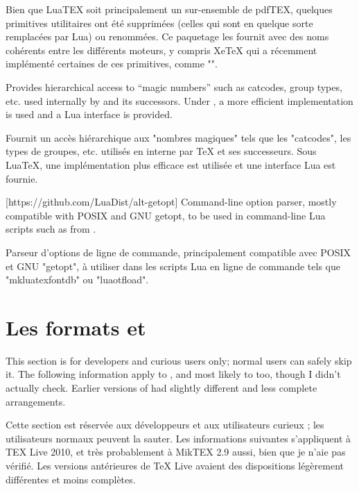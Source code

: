 \documentclass{lltxdoc}
\begin{document}
Bien que LuaTEX soit principalement un sur-ensemble de pdfTEX, quelques primitives utilitaires ont été supprimées (celles qui sont en quelque sorte remplacées par Lua) ou renommées. Ce paquetage les fournit avec des noms cohérents entre les différents moteurs, y compris XeTeX qui a récemment implémenté certaines de ces primitives, comme "\strcmp".
%

Provides hierarchical access to ``magic numbers'' such as catcodes, group
types, etc. used internally by \tex and its successors. Under \luatex, a more
efficient implementation is used and a Lua interface is provided.

Fournit un accès hiérarchique aux "nombres magiques" tels que les "catcodes", les types de groupes, etc. utilisés en interne par TeX et ses successeurs. Sous LuaTeX, une implémentation plus efficace est utilisée et une interface Lua est fournie.

[https://github.com/LuaDist/alt-getopt]
Command-line option parser, mostly compatible with POSIX and GNU getopt, to be
used in command-line Lua scripts such as  from
.

Parseur d'options de ligne de commande, principalement compatible avec POSIX et GNU "getopt", à utiliser dans les scripts Lua en ligne de commande tels que "mkluatexfontdb" ou "luaotfload".

\section{Les formats  et }\label{formats}

This section is for developers and curious users only; normal users can safely
skip it. The following information apply to , and most likely to
 too, though I didn't actually check. Earlier versions of \texlive
had slightly different and less complete arrangements.

Cette section est réservée aux développeurs et aux utilisateurs curieux ; les utilisateurs normaux peuvent la sauter. Les informations suivantes s'appliquent à TEX Live 2010, et très probablement à MikTEX 2.9 aussi, bien que je n'aie pas vérifié. Les versions antérieures de TeX Live avaient des dispositions légèrement différentes et moins complètes.
\end{document}
